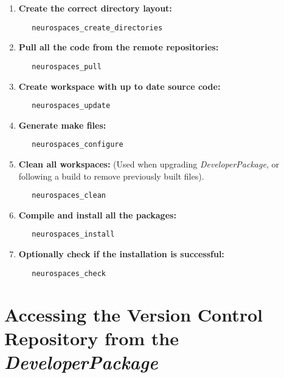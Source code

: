 \documentclass[12pt]{article}
\begin{document}
\begin{enumerate}
\item {\bf Create the correct directory layout:}
\begin{verbatim}
   neurospaces_create_directories
\end{verbatim}

\item {\bf Pull all the code from the remote repositories:}
\begin{verbatim}
   neurospaces_pull
\end{verbatim}

\item {\bf Create workspace with up to date source code:}
\begin{verbatim}
   neurospaces_update
\end{verbatim}

\item {\bf Generate make files:}
\begin{verbatim}
   neurospaces_configure
\end{verbatim}

\item {\bf Clean all workspaces:} (Used when upgrading {\emph{DeveloperPackage}}, or following a build to remove previously built files).
\begin{verbatim}
   neurospaces_clean
\end{verbatim}

\item {\bf Compile and install all the packages:}
\begin{verbatim}
   neurospaces_install
\end{verbatim}

\item {\bf Optionally check if the installation is successful:}
\begin{verbatim}
   neurospaces_check
\end{verbatim}

\end{enumerate}

\section*{Accessing the Version Control Repository from the {\emph{DeveloperPackage}}}

\end{document}
